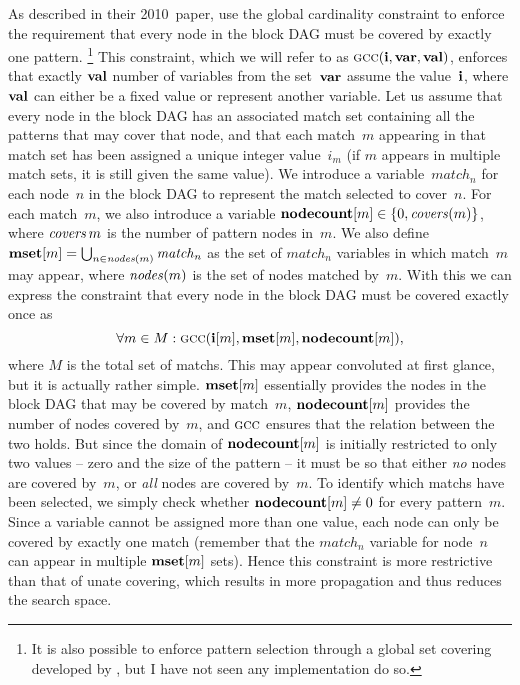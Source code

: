 As described in their 2010~paper, \citeauthor{Floch2010} use the \gls{global
  cardinality constraint} to enforce the requirement that every \gls{node} in
the \gls{block DAG} must be covered by exactly one \gls{pattern}.\!%
%
\footnote{%
  It is also possible to enforce \gls{pattern selection} through a global set
  covering developed by \textcite{Mouthuy2007}, but I have not seen any
  implementation do so.%
}
%
%
This \gls{constraint}, which we will refer to as \mbox{$\mGCC(\mVar{i},
  \mVar{var}, \mVar{val})$}, enforces that exactly $\mVar{val}$ number of
\glspl{variable} from the set~$\mVar{var}$ assume the value~$\mVar{i}$, where
$\mVar{val}$ can either be a fixed value or represent another \gls{variable}.
%
Let us assume that every \gls{node} in the \gls{block DAG} has an associated
\gls{match set} containing all the \glspl{pattern} that may cover that
\gls{node}, and that each \gls{match}~$m$ appearing in that \gls{match set} has
been assigned a unique integer value~$i_m$ (if $m$ appears in multiple
\glspl{match set}, it is still given the same value).
%
We introduce a \gls{variable}~$\mathit{match}_n$ for each \gls{node}~$n$ in the
\gls{block DAG} to represent the \gls{match} selected to cover~$n$.
%
For each \gls{match}~$m$, we also introduce a \gls{variable}
\mbox{$\mVar{nodecount}[m] \in \mSet{0, \mCovers(m)}$}, where
\mbox{$\operatorname{\textrm{\textit{covers}}}{m}$} is the number of \gls{pattern} \glspl{node} in~$m$.
%
We also define \mbox{$\mVar{mset}[m] = \bigcup_{n \in \mFunFont{nodes}(m)}
  \mathit{match}_n$} as the set of $\mathit{match}_n$ variables in which
\gls{match}~$m$ may appear, where $\textrm{\textit{nodes}}(m)$ is the set of
\glspl{node} matched by~$m$.
%
With this we can express the \gls{constraint} that every \gls{node} in the
\gls{block DAG} must be covered exactly once as
%
\begin{displaymath}
  \forall m \in M :
  \mGCC(\mVar{i}[m], \mVar{mset}[m], \mVar{nodecount}[m]),
\end{displaymath}
%
where $M$ is the total set of \glspl{match}.
%
This may appear convoluted at first glance, but it is actually rather simple.
%
$\mVar{mset}[m]$ essentially provides the \glspl{node} in the \gls{block DAG}
that may be covered by \gls{match}~$m$, $\mVar{nodecount}[m]$ provides the
number of \glspl{node} covered by~$m$, and $\mGCC$ ensures that the relation
between the two holds.
%
But since the domain of $\mVar{nodecount}[m]$ is initially restricted to only
two values -- zero and the size of the \gls{pattern} -- it must be so that
either \emph{no} \glspl{node} are covered by~$m$, or \emph{all} \glspl{node} are
covered by~$m$.
%
To identify which \glspl{match} have been selected, we simply check whether
\mbox{$\mVar{nodecount}[m] \neq 0$} for every \gls{pattern}~$m$.
%
Since a \gls{variable} cannot be assigned more than one value, each \gls{node}
can only be covered by exactly one \gls{match} (remember that the
$\mathit{match}_n$ variable for \gls{node}~$n$ can appear in multiple
$\mVar{mset}[m]$ sets).
%
Hence this \gls{constraint} is more restrictive than that of \gls{unate
  covering}, which results in more propagation and thus reduces the search
space.

